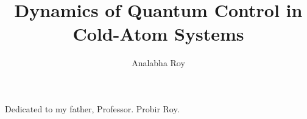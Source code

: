 \documentclass[12pt]{report}	%
\author{Analabha Roy}  	%
\title{Dynamics of Quantum Control in Cold-Atom Systems}
\theoremstyle{definition}
\theoremstyle{remark}
\begin{document}
\copyrightpage          %


%
%
%
\commcertpage           %

\titlepage              %



%
\begin{dedication}
%
Dedicated to my father, Professor. Probir Roy.
\end{dedication}
\end{document}
